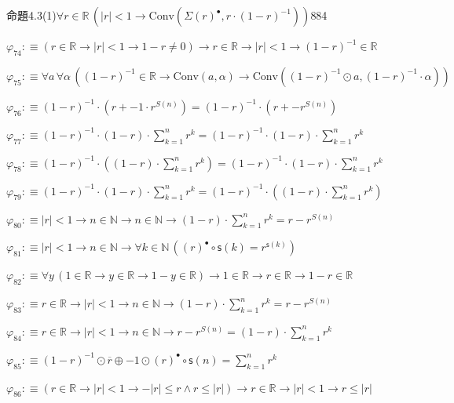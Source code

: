 \begin{fullproof}{命題4.3(1)}{$\forall r \in \mathbb{R}\,(\lvert r \rvert < 1 \to \mathrm{Conv}(\Sigma {(r)^{\bullet}},r \cdot (1 - r)^{-1}))$}{884}
\begin{abbrevlist}
\item $\varphi_{74} :\equiv (r \in \mathbb{R} \to \lvert r \rvert < 1 \to 1 - r \neq 0) \to r \in \mathbb{R} \to \lvert r \rvert < 1 \to (1 - r)^{-1} \in \mathbb{R}$
\item $\varphi_{75} :\equiv \forall a\,\forall \alpha\,((1 - r)^{-1} \in \mathbb{R} \to \mathrm{Conv}(a,\alpha) \to \mathrm{Conv}((1 - r)^{-1} \odot a,(1 - r)^{-1} \cdot \alpha))$
\item $\varphi_{76} :\equiv (1 - r)^{-1} \cdot (r + -1 \cdot {{r}^{S(n)}}) = (1 - r)^{-1} \cdot (r + -{{r}^{S(n)}})$
\item $\varphi_{77} :\equiv (1 - r)^{-1} \cdot (1 - r) \cdot {\textstyle\sum_{k=1}^{n} {{r}^{k}}} = (1 - r)^{-1} \cdot (1 - r) \cdot {\textstyle\sum_{k=1}^{n} {{r}^{k}}}$
\item $\varphi_{78} :\equiv (1 - r)^{-1} \cdot ((1 - r) \cdot {\textstyle\sum_{k=1}^{n} {{r}^{k}}}) = (1 - r)^{-1} \cdot (1 - r) \cdot {\textstyle\sum_{k=1}^{n} {{r}^{k}}}$
\item $\varphi_{79} :\equiv (1 - r)^{-1} \cdot (1 - r) \cdot {\textstyle\sum_{k=1}^{n} {{r}^{k}}} = (1 - r)^{-1} \cdot ((1 - r) \cdot {\textstyle\sum_{k=1}^{n} {{r}^{k}}})$
\item $\varphi_{80} :\equiv \lvert r \rvert < 1 \to n \in \mathbb{N} \to n \in \mathbb{N} \to (1 - r) \cdot {\textstyle\sum_{k=1}^{n} {{r}^{k}}} = r - {{r}^{S(n)}}$
\item $\varphi_{81} :\equiv \lvert r \rvert < 1 \to n \in \mathbb{N} \to \forall k \in \mathbb{N}\,({(r)^{\bullet}} \circ \mathsf{s}(k) = {{r}^{\mathsf{s}(k)}})$
\item $\varphi_{82} :\equiv \forall y\,(1 \in \mathbb{R} \to y \in \mathbb{R} \to 1 - y \in \mathbb{R}) \to 1 \in \mathbb{R} \to r \in \mathbb{R} \to 1 - r \in \mathbb{R}$
\item $\varphi_{83} :\equiv r \in \mathbb{R} \to \lvert r \rvert < 1 \to n \in \mathbb{N} \to (1 - r) \cdot {\textstyle\sum_{k=1}^{n} {{r}^{k}}} = r - {{r}^{S(n)}}$
\item $\varphi_{84} :\equiv r \in \mathbb{R} \to \lvert r \rvert < 1 \to n \in \mathbb{N} \to r - {{r}^{S(n)}} = (1 - r) \cdot {\textstyle\sum_{k=1}^{n} {{r}^{k}}}$
\item $\varphi_{85} :\equiv (1 - r)^{-1} \odot \overline{r} \oplus -1 \odot {(r)^{\bullet}} \circ \mathsf{s}(n) = {\textstyle\sum_{k=1}^{n} {{r}^{k}}}$
\item $\varphi_{86} :\equiv (r \in \mathbb{R} \to \lvert r \rvert < 1 \to -\lvert r \rvert \leq r \land r \leq \lvert r \rvert) \to r \in \mathbb{R} \to \lvert r \rvert < 1 \to r \leq \lvert r \rvert$

\end{abbrevlist}
\end{fullproof}
